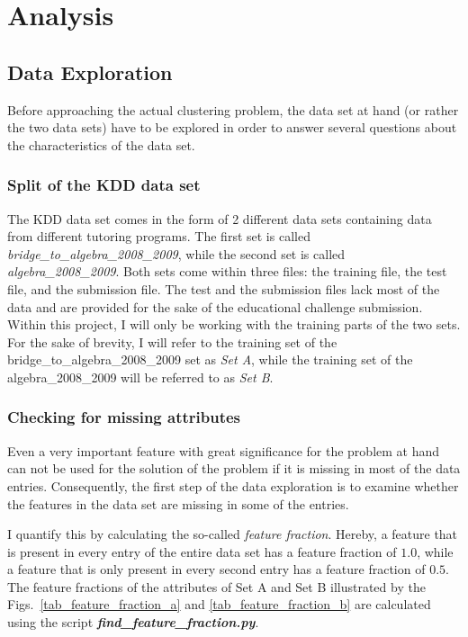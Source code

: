 \newpage
\section{Analysis}

\subsection{Data Exploration}

Before approaching the actual clustering problem, the data set at hand (or rather the two data sets) have to be explored in order to answer several questions about the characteristics of the data set.

\subsubsection{Split of the KDD data set}

The KDD data set comes in the form of 2 different data sets containing data from different tutoring programs. The first set is called \emph{bridge\_to\_algebra\_2008\_2009}, while the second set is called \emph{algebra\_2008\_2009}. Both sets come within three files: the training file, the test file, and the submission file. The test and the submission files lack most of the data and are provided for the sake of the educational challenge submission. Within this project, I will only be working with the training parts of the two sets. For the sake of brevity, I will refer to the training set of the bridge\_to\_algebra\_2008\_2009 set as \emph{Set A}, while the training set of the algebra\_2008\_2009 will be referred to as \emph{Set B}.

\subsubsection{Checking for missing attributes}

Even a very important feature with great significance for the problem at hand can not be used for the solution of the problem if it is missing in most of the data entries. Consequently, the first step of the data exploration is to examine whether the features in the data set are missing in some of the entries. 

I quantify this by calculating the so-called \emph{feature fraction}. Hereby, a feature that is present in every entry of the entire data set has a feature fraction of $1.0$, while a feature that is only present in every second entry has a feature fraction of $0.5$. The feature fractions of the attributes of Set A and Set B illustrated by the Figs.~\ref{tab_feature_fraction_a} and \ref{tab_feature_fraction_b} are calculated using the script \textbf{\emph{find\_feature\_fraction.py}}.

